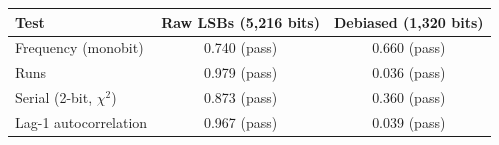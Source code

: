 \begin{tabular}{lcc}
\toprule
Test & Raw LSBs (5{,}216 bits) & Debiased (1{,}320 bits) \\
\midrule
Frequency (monobit) & 0.740 (pass) & 0.660 (pass) \\
Runs & 0.979 (pass) & 0.036 (pass) \\
Serial (2-bit, $\chi^2$) & 0.873 (pass) & 0.360 (pass) \\
Lag-1 autocorrelation & 0.967 (pass) & 0.039 (pass) \\
\bottomrule
\end{tabular}
